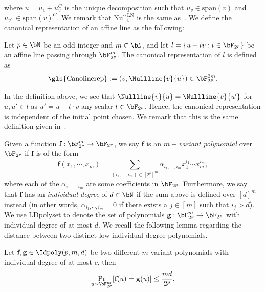 where $u = u_v + u_{v}^{C}$ is the unique decomposition such that $u_v \in \text{span}({v})$ and $u_{v^{C}} \in\text{span}({v})^{C}$. We remark that $\text{Null}_{v}^{\text{LN}}$ is the same as~\cite[Definition  7.3]{jiMIPRE2022a}. We define the canonical representation of an affine line as the following:
\begin{definition}\label{def:canorepline}
	Let $p \in \bN$ be an odd integer and $m \in \bN$, and let $l = \{ u + tv: t \in \bF_{2^p}\}$ be an affine line passing through $\bF_{2^p}^m$. The canonical representation of $l$ is defined as 
	\begin{equation*}
		\text{\gls{Canolinerep}} := (v, \Nullline{v}{u}) \in \bF_{2^p}^{2m}.
	\end{equation*}
\end{definition}
In the definition above, we see that $\Nullline{v}{u} =  \Nullline{v}{u'}$ for $u, u' \in l$ as $u' = u + t \cdot v$ any scalar $t \in \bF_{2^p}$. Hence, the canonical representation is independent of the initial point chosen. We remark that this is the same definition given in~\cite[Definition 7.3]{jiMIPRE2022a}.

Given a function $\textbf{f}: \bF_{2^p}^m \rightarrow \bF_{2^p}$, we say $\textbf{f}$ is an \textit{$m-$variant polynomial} over $\bF_{2^p}$ if $\textbf{f}$ is of the form
\begin{equation*}
	\textbf{f}(x_1, \cdots, x_m) = \sum_{(i_1, \cdots, i_m) \in [2^p]^m} \alpha_{i_1, \cdots, i_m} x_1^{i_1} \cdots x_m^{i_m},
\end{equation*}
where each of the $\alpha_{i_1, \cdots, i_m}$ are some coefficients in $\bF_{2^p}$. Furthermore, we say that $\textbf{f}$ has an \textit{individual degree} of $d \in \bN$ if the sum above is defined over $[d]^m$ instead (in other words, $\alpha_{i_1, \cdots, i_m} =0$ if there exists a $j \in [m]$ such that $i_j > d$). We use \gls{LDpolyset} to denote the set of polynomials $\textbf{g}: \bF_{2^p}^m \rightarrow\bF_{2^p}$ with individual degree of at most $d$. We recall the following lemma regarding the distance between two distinct low-individual degree polynomials. 
\begin{lemma} \label{lem:Schwartz_Zipple}
	Let $\textbf{f},\textbf{g}\in \Idpoly(p,m,d)$ be two different $m$-variant polynomials with individual degree of at most $c$, then 
	\begin{equation*}
		\Pr_{u \sim \bF_{2^p}^m} [\textbf{f}(u) = \textbf{g}(u)] \leq \frac{md}{2^p}. 
	\end{equation*}
\end{lemma}

